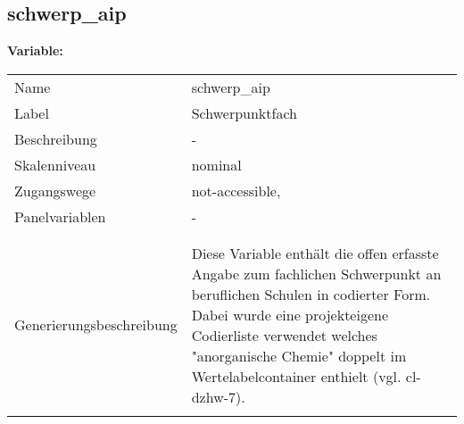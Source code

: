 	
	
	\subsection{schwerp\_aip}
	\label{subSection:schwerp_aip}

	\noindent\textbf{Variable:}\\
		\begin{tabular}{lL{11.3cm}}
			\label{tableVariable:schwerp_aip}
			Name & schwerp\_aip \\
			Label & Schwerpunktfach \\
			Beschreibung & - \\
			Skalenniveau & nominal \\
			Zugangswege &
				not-accessible,
 \\
			Panelvariablen & -
			 \\
			 \\
 \\
					Generierungsbeschreibung & Diese Variable enthält die offen erfasste Angabe zum fachlichen Schwerpunkt an beruflichen Schulen in codierter Form. Dabei wurde eine projekteigene Codierliste verwendet welches "anorganische Chemie" doppelt im Wertelabelcontainer enthielt (vgl. cl-dzhw-7).
				 \\	
			 \\
		\end{tabular}






	
	\newpage
